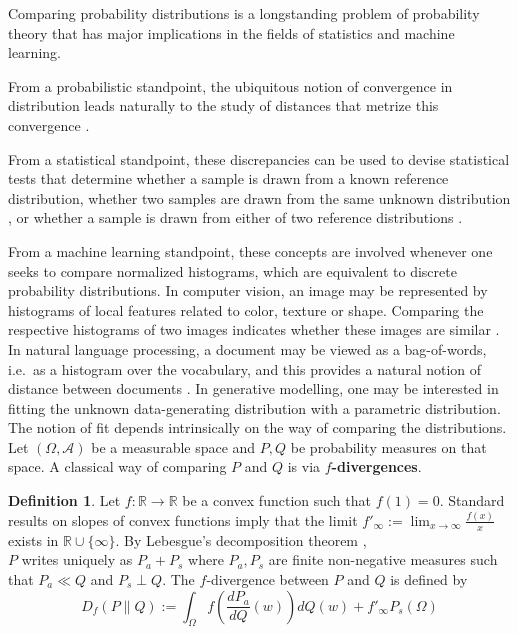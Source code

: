 \documentclass[12pt]{report}
\theoremstyle{definition}
\newtheorem{defi}{Definition}[section]
\theoremstyle{remark}
\begin{document}
\hspace{\parindent}Comparing probability distributions is a longstanding problem of probability theory that has major implications in the fields of statistics and machine learning. 
\par
From a probabilistic standpoint, the ubiquitous notion of convergence in distribution leads naturally to the study of distances that metrize this convergence \cite{billingsley1971convergence}.  
\par
From a statistical standpoint, these discrepancies can be used to devise statistical tests that determine whether a sample is drawn from a known reference distribution, whether two samples are drawn from the same unknown distribution \cite[Theorem~8.5 and~8.7]{bhattacharya2016course}, \cite{gretton2012kernel} or whether a sample is drawn from either of two reference distributions \cite[Theorem~13.1.1]{lehmann2006testing}. 
\par
From a machine learning standpoint, these concepts are involved whenever one seeks to compare normalized histograms, which are equivalent to discrete probability distributions. In computer vision, an image may be represented by histograms of local features related to color, texture or shape. Comparing the respective histograms of two images indicates whether these images are similar \cite{kolouri2017optimal}. In natural language processing, a document may be viewed as a bag-of-words, i.e.\ as a histogram over the vocabulary, and this provides a natural notion of distance between documents \cite{kusner2015word}. In generative modelling, one may be interested in fitting the unknown data-generating distribution with a parametric distribution. The notion of fit depends intrinsically on the way of comparing the distributions.
\newpage
Let $(\Omega,\mathcal A)$ be a measurable space and $P,Q$ be probability measures on that space. A classical way of comparing $P$ and $Q$ is via \textbf{$f$-divergences}.

\begin{defi}
	Let $f:\mathbb R\to \mathbb R$ be a convex function such that $f(1)=0$. Standard results on slopes of convex functions imply that the limit $f'_\infty:= \lim_{x\to\infty} \frac{f(x)}x$ exists in $\mathbb R\cup \{\infty\}$. By Lebesgue's decomposition theorem \cite[Theorem~7.33]{klenke2013probability},\\ $P$ writes uniquely as $P_a+P_s$ where $P_a,P_s$ are finite non-negative measures such that $P_a\ll Q$ and $P_s\perp Q$.
	The $f$-divergence between $P$ and $Q$ is defined by $$D_f(P\|Q) := \int_\Omega f\left(\frac{dP_a}{dQ}(w) \right) dQ(w) + f'_\infty P_s(\Omega)$$
\end{defi}
\end{document}
